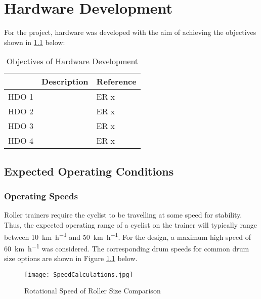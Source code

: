 
\chapter{Hardware Development}

For the project, hardware was developed with the aim of achieving the objectives shown in \ref{tab:devgoals} below:

\begin{table}[H]
	\renewcommand{\arraystretch}{\tablestretch}
	\centering
	\caption{Objectives of Hardware Development}
	\begin{tabularx}{\textwidth}{p{3.2cm} >{\raggedright}X >{\raggedright\arraybackslash}p{2cm}}
		\toprule
		      & Description & Reference \\
		\midrule
		HDO 1 &             & ER x      \\
		HDO 2 &             & ER x      \\
		HDO 3 &             & ER x      \\
		HDO 4 &             & ER x      \\
		\bottomrule
	\end{tabularx}
	\label{tab:devgoals}
\end{table}

\newpage

\section{Expected Operating Conditions}

\subsection{Operating Speeds}
\label{sec:opspeed}

Roller trainers require the cyclist to be travelling at some speed for stability. Thus, the expected operating range of a cyclist on the trainer will typically range between \SI{10}{\kilo\meter\per\hour} and \SI{50}{\kilo\meter\per\hour}. For the design, a maximum high speed of \SI{60}{\kilo\meter\per\hour} was considered. The corresponding drum speeds for common drum size options are shown in Figure \ref{fig:speedCalc} below.

\begin{figure}[H]
	\begin{center}
		\texttt{[image: SpeedCalculations.jpg]}
		\caption{Rotational Speed of Roller Size Comparison}
		\label{fig:speedCalc}
	\end{center}
\end{figure}

